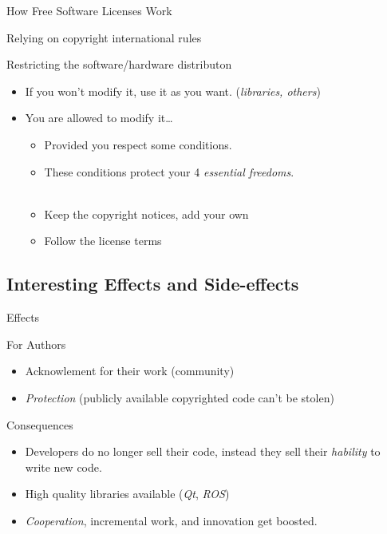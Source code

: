   \begin{frame}{How Free Software Licenses Work}
    \begin{block}{Relying on \alert{copyright} international rules}
    \end{block}
    \begin{block}{Restricting the software/hardware distributon}
      \begin{itemize}
        \item If you won't modify it, use it as you want. (\emph{libraries, others})
        \item You are allowed to modify it\dots
          \begin{itemize}
            \item Provided you respect some conditions.
            \item These conditions protect your 4 \emph{essential freedoms}.\\~\\
            \item Keep the copyright notices, add your own
            \item Follow the license terms
         \end{itemize}
       \end{itemize}
    \end{block}
  \end{frame}

%
\subsection{Interesting Effects and Side-effects}

  \begin{frame}{Effects}
    \begin{block}{For Authors}
      \begin{itemize}
        \item Acknowlement for their work (community)
        \item \emph{Protection} (publicly available copyrighted code can't be stolen)
      \end{itemize}
    \end{block}
    \begin{block}{Consequences}
      \begin{itemize}
        \item Developers do no longer sell their code, instead they sell their \emph{hability} to write new code.
        \item High quality libraries available (\emph{Qt}, \emph{ROS})
        \item \emph{Cooperation}, incremental work, and \alert{innovation} get boosted.
      \end{itemize}
    \end{block}
  \end{frame}

